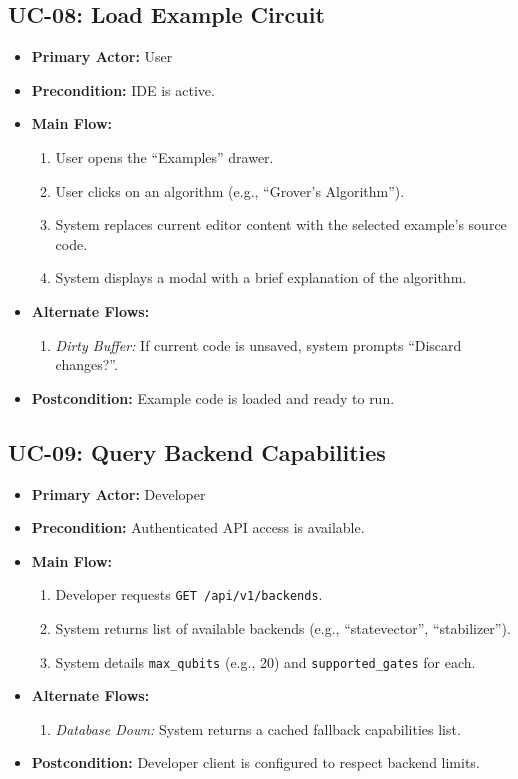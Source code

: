 \subsection{UC-08: Load Example Circuit}
\begin{itemize}
    \item \textbf{Primary Actor:} User
    \item \textbf{Precondition:} IDE is active.
    \item \textbf{Main Flow:}
    \begin{enumerate}
        \item User opens the ``Examples'' drawer.
        \item User clicks on an algorithm (e.g., ``Grover's Algorithm'').
        \item System replaces current editor content with the selected example's source code.
        \item System displays a modal with a brief explanation of the algorithm.
    \end{enumerate}
    \item \textbf{Alternate Flows:}
    \begin{enumerate}
        \item [3a] \textit{Dirty Buffer:} If current code is unsaved, system prompts ``Discard changes?''.
    \end{enumerate}
    \item \textbf{Postcondition:} Example code is loaded and ready to run.
\end{itemize}

\subsection{UC-09: Query Backend Capabilities}
\begin{itemize}
    \item \textbf{Primary Actor:} Developer
    \item \textbf{Precondition:} Authenticated API access is available.
    \item \textbf{Main Flow:}
    \begin{enumerate}
        \item Developer requests \texttt{GET /api/v1/backends}.
        \item System returns list of available backends (e.g., ``statevector'', ``stabilizer'').
        \item System details \texttt{max\_qubits} (e.g., 20) and \texttt{supported\_gates} for each.
    \end{enumerate}
    \item \textbf{Alternate Flows:}
    \begin{enumerate}
        \item [2a] \textit{Database Down:} System returns a cached fallback capabilities list.
    \end{enumerate}
    \item \textbf{Postcondition:} Developer client is configured to respect backend limits.
\end{itemize}

